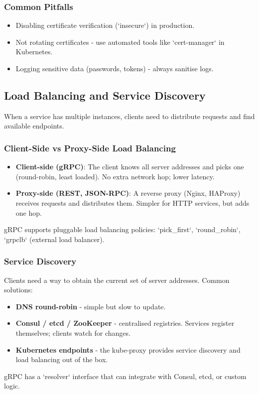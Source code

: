 \documentclass[a4paper]{article}
\begin{document}
\subsubsection{Common Pitfalls}
\begin{itemize}
    \item Disabling certificate verification (`insecure`) in production.
    \item Not rotating certificates - use automated tools like `cert-manager` in Kubernetes.
    \item Logging sensitive data (passwords, tokens) - always sanitise logs.
\end{itemize}

\subsection{Load Balancing and Service Discovery}
When a service has multiple instances, clients need to distribute requests and find available endpoints.

\subsubsection{Client-Side vs Proxy-Side Load Balancing}
\begin{itemize}
    \item \textbf{Client-side (gRPC)}: The client knows all server addresses and picks one (round-robin, least loaded). No extra network hop; lower latency.
    \item \textbf{Proxy-side (REST, JSON-RPC)}: A reverse proxy (Nginx, HAProxy) receives requests and distributes them. Simpler for HTTP services, but adds one hop.
\end{itemize}
gRPC supports pluggable load balancing policies: `pick\_first`, `round\_robin`, `grpclb` (external load balancer).

\subsubsection{Service Discovery}
Clients need a way to obtain the current set of server addresses. Common solutions:
\begin{itemize}
    \item \textbf{DNS round-robin} - simple but slow to update.
    \item \textbf{Consul / etcd / ZooKeeper} - centralised registries. Services register themselves; clients watch for changes.
    \item \textbf{Kubernetes endpoints} - the kube-proxy provides service discovery and load balancing out of the box.
\end{itemize}
gRPC has a `resolver` interface that can integrate with Consul, etcd, or custom logic.
\end{document}
